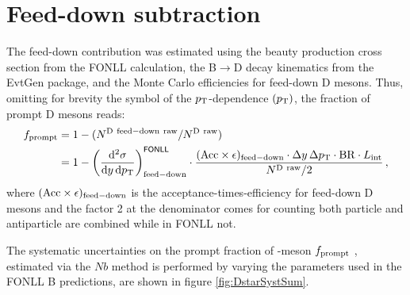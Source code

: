 \section{Feed-down subtraction}

The feed-down contribution was estimated using 
the beauty production cross section from the FONLL calculation,
the B$\rightarrow$D decay kinematics from the EvtGen package,
and the Monte Carlo efficiencies for feed-down D mesons. 
Thus, omitting for brevity the symbol of the $p_{\rm T}$-dependence $(p_{\rm T})$, 
the fraction of prompt D mesons reads:
\begin{equation}
 \label{eq:fcNbMethod}
 \begin{split}
   f_{\rm prompt} &= 1-(N^{\rm D~feed-down~raw}/N^{\rm D~raw})\\
   &= 1 -  \left( \frac{{\rm d}^2 \sigma}{{\rm d}y \, {\rm d}p_{\rm T} }
\right)^{{\sf FONLL}} _{{\rm feed-down}} \cdot
\frac{({\rm Acc}\times\epsilon)_{\rm feed-down}\cdot\Delta y \, \Delta p_{\rm T}
\cdot {\rm BR} \cdot L_{\rm int}  }{ N^{\rm D~raw }  / 2} \, ,
 \end{split}
\end{equation}
where $({\rm Acc}\times\epsilon)_{{\rm feed-down}}$ is the 
acceptance-times-efficiency for feed-down D mesons and the factor 2 at the denominator
comes for counting both particle and antiparticle
are combined while in FONLL not.

The systematic uncertainties on the prompt fraction of \Dstar -meson $f_{\rm prompt}$ , estimated via the $Nb$ method is performed by varying the parameters used in the FONLL B predictions, are shown in figure \ref{fig:DstarSystSum}.


